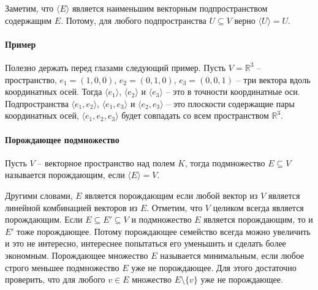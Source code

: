 Заметим, что $\langle E \rangle$ является наименьшим векторным подпространством содержащим $E$.
Потому, для любого подпространства $U\subseteq V$ верно $\langle U \rangle  = U$.


\paragraph{Пример}

Полезно держать перед глазами следующий пример.
Пусть $V = \mathbb R^3$ -- пространство, $e_1 =(1,0,0)$, $e_2 = (0,1,0)$, $e_3 = (0,0,1)$ -- три вектора вдоль координатных осей.
Тогда $\langle e_1\rangle$, $\langle e_2\rangle$ и $\langle e_3\rangle$ -- это в точности координатные оси.
Подпространства $\langle e_1, e_2\rangle$, $\langle e_1, e_3\rangle$ и $\langle e_2, e_3\rangle$ -- это плоскости содержащие пары координатных осей, $\langle e_1, e_2, e_3\rangle$ будет совпадать со всем пространством $\mathbb R^3$.

\paragraph{Порождающее подмножество}

\begin{definition}
Пусть $V$ -- векторное пространство над полем $K$, тогда подмножество $E\subseteq V$ называется порождающим, если $\langle E \rangle  = V$.
\end{definition}

Другими словами, $E$ является порождающим если любой вектор из $V$ является линейной комбинацией векторов из $E$.
Отметим, что $V$ целиком всегда является порождающим.
Если $E\subseteq E'\subseteq V$ и подмножество $E$ является порождающим, то и $E'$ тоже порождающее.
Потому порождающее семейство всегда можно увеличить и это не интересно, интереснее попытаться его уменьшить и сделать более экономным.
Порождающее множество $E$ называется минимальным, если любое строго меньшее подмножество $E$ уже не порождающее.
Для этого достаточно проверить, что для любого $v\in E$ множество $E\setminus \{v\}$ уже не порождающее.
